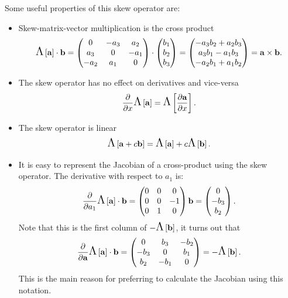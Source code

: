 Some useful properties of this skew operator are:
\begin{itemize}
\item Skew-matrix-vector multiplication is the cross product
  \begin{equation}
    \text{\Large{$\Lambda$}}\left[ {\mathbf{a}} \right] \cdot {\mathbf{b}}
    = \begin{pmatrix}
      0 & -a_3 & a_2 \\
      a_3 & 0 & -a_1 \\
      -a_2 & a_1 & 0
    \end{pmatrix}
    \cdot \begin{pmatrix} b_1 \\ b_2 \\ b_3 \end{pmatrix}
    = \begin{pmatrix} -a_3b_2 + a_2b_3 \\ a_3b_1 - a_1b_3 \\ -a_2b_1 + a_1b_2 \end{pmatrix}
    = {\mathbf{a}} \times {\mathbf{b}}.
  \end{equation}

\item The skew operator has no effect on derivatives and vice-versa
  \begin{equation}
    \frac{\partial }{\partial x} \text{\Large{$\Lambda$}}\left[ {\mathbf{a}} \right] = \text{\Large{$\Lambda$}}\left[  \frac{\partial {\mathbf{a}}}{\partial x}  \right].
  \end{equation}

\item The skew operator is linear
  \begin{equation}
    \text{\Large{$\Lambda$}}\left[ {\mathbf{a}} + c {\mathbf{b}} \right] = \text{\Large{$\Lambda$}}\left[ {\mathbf{a}} \right] + c \text{\Large{$\Lambda$}}\left[ {\mathbf{b}} \right].
  \end{equation}

\item It is easy to represent the Jacobian of a cross-product using the skew operator.
  The derivative with respect to $a_1$ is: 
  \begin{equation}
    \frac{\partial }{\partial a_1} \text{\Large{$\Lambda$}}\left[ {\mathbf{a}} \right] \cdot {\mathbf{b}} = \begin{pmatrix}
      0 & 0 & 0 \\
      0 & 0 & -1 \\
      0 & 1 & 0
    \end{pmatrix}{\mathbf{b}} = \begin{pmatrix} 0 \\ -b_3 \\ b_2 \end{pmatrix}.
  \end{equation}
  Note that this is the first column of $-\text{\Large{$\Lambda$}}\left[ {\mathbf{b}} \right]$, it turns out that
  \begin{equation}
    \frac{\partial }{\partial {\mathbf{a}}} \text{\Large{$\Lambda$}}\left[ {\mathbf{a}} \right] \cdot {\mathbf{b}} = \begin{pmatrix}
      0 & b_3 & -b_2 \\
      -b_3 & 0 & b_1 \\
      b_2 & -b_1 & 0
    \end{pmatrix} = -\text{\Large{$\Lambda$}}\left[ {\mathbf{b}} \right].
    \label{eq:61}
  \end{equation}
  This is the main reason for preferring to calculate the Jacobian using this notation.
\end{itemize}

